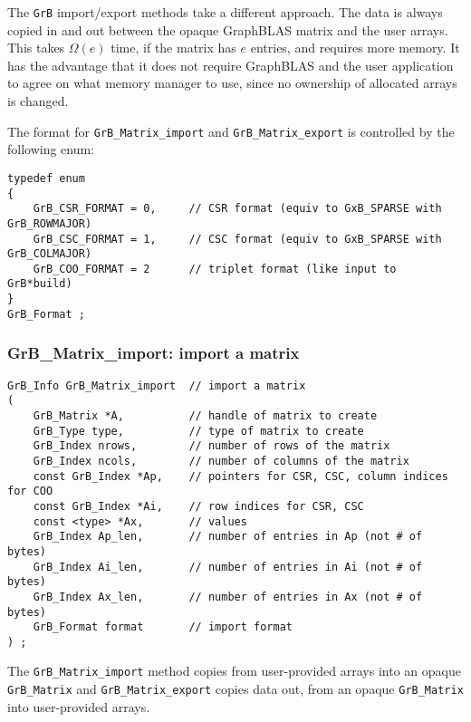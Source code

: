 \documentclass[12pt]{article}
\begin{document}
The \verb'GrB' import/export methods take a different approach.  The data
is always copied in and out between the opaque GraphBLAS matrix and the
user arrays.  This takes $\Omega(e)$ time, if the matrix has $e$ entries,
and requires more memory.  It has the advantage that it does not require
GraphBLAS and the user application to agree on what memory manager to use,
since no ownership of allocated arrays is changed.

The format for \verb'GrB_Matrix_import' and \verb'GrB_Matrix_export' is
controlled by the following enum:

{\footnotesize
\begin{verbatim}
typedef enum
{
    GrB_CSR_FORMAT = 0,     // CSR format (equiv to GxB_SPARSE with GrB_ROWMAJOR)
    GrB_CSC_FORMAT = 1,     // CSC format (equiv to GxB_SPARSE with GrB_COLMAJOR)
    GrB_COO_FORMAT = 2      // triplet format (like input to GrB*build)
}
GrB_Format ; \end{verbatim}}

\newpage
\subsubsection{{\sf GrB\_Matrix\_import:}  import a matrix}
\label{GrB_matrix_import}

\begin{mdframed}[userdefinedwidth=6in]
{\footnotesize
\begin{verbatim}
GrB_Info GrB_Matrix_import  // import a matrix
(
    GrB_Matrix *A,          // handle of matrix to create
    GrB_Type type,          // type of matrix to create
    GrB_Index nrows,        // number of rows of the matrix
    GrB_Index ncols,        // number of columns of the matrix
    const GrB_Index *Ap,    // pointers for CSR, CSC, column indices for COO
    const GrB_Index *Ai,    // row indices for CSR, CSC
    const <type> *Ax,       // values
    GrB_Index Ap_len,       // number of entries in Ap (not # of bytes)
    GrB_Index Ai_len,       // number of entries in Ai (not # of bytes)
    GrB_Index Ax_len,       // number of entries in Ax (not # of bytes)
    GrB_Format format       // import format
) ;
\end{verbatim}
} \end{mdframed}

The \verb'GrB_Matrix_import' method copies from user-provided arrays into an
opaque \verb'GrB_Matrix' and \verb'GrB_Matrix_export' copies data out, from an
opaque \verb'GrB_Matrix' into user-provided arrays.
\end{document}
